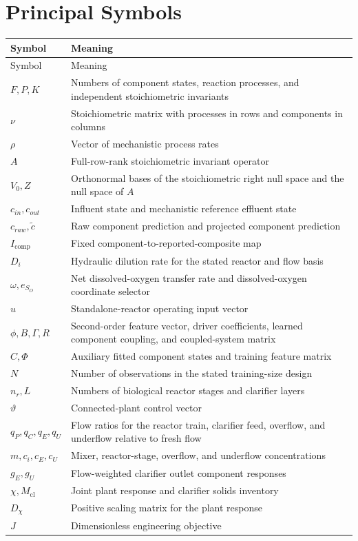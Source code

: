 \documentclass[12pt,twoside]{book}
\begin{document}
\chapter*{Principal Symbols}
\begin{longtable}{p{}p{}}
\toprule
Symbol & Meaning \\
\midrule
\endfirsthead
\toprule Symbol & Meaning \\
\midrule
\endhead
$F,P,K$ & Numbers of component states, reaction processes, and independent stoichiometric invariants \\
$\nu$ & Stoichiometric matrix with processes in rows and components in columns \\
$\rho$ & Vector of mechanistic process rates \\
$A$ & Full-row-rank stoichiometric invariant operator \\
$V_0,Z$ & Orthonormal bases of the stoichiometric right null space and the null space of $A$ \\
$c_{in},c_{out}$ & Influent state and mechanistic reference effluent state \\
$c_{raw},\widetilde c$ & Raw component prediction and projected component prediction \\
$I_{\mathrm{comp}}$ & Fixed component-to-reported-composite map \\
$D_i$ & Hydraulic dilution rate for the stated reactor and flow basis \\
$\omega,e_{S_O}$ & Net dissolved-oxygen transfer rate and dissolved-oxygen coordinate selector \\
$u$ & Standalone-reactor operating input vector \\
$\phi,B,\Gamma,R$ & Second-order feature vector, driver coefficients, learned component coupling, and coupled-system matrix \\
$\widehat C,\Phi$ & Auxiliary fitted component states and training feature matrix \\
$N$ & Number of observations in the stated training-size design \\
$n_r,L$ & Numbers of biological reactor stages and clarifier layers \\
$\vartheta$ & Connected-plant control vector \\
$q_P,q_C,q_E,q_U$ & Flow ratios for the reactor train, clarifier feed, overflow, and underflow relative to fresh flow \\
$m,c_i,c_E,c_U$ & Mixer, reactor-stage, overflow, and underflow concentrations \\
$g_E,g_U$ & Flow-weighted clarifier outlet component responses \\
$\chi,M_{\mathrm{cl}}$ & Joint plant response and clarifier solids inventory \\
$D_\chi$ & Positive scaling matrix for the plant response \\
$J$ & Dimensionless engineering objective \\
\bottomrule
\end{longtable}
\end{document}
